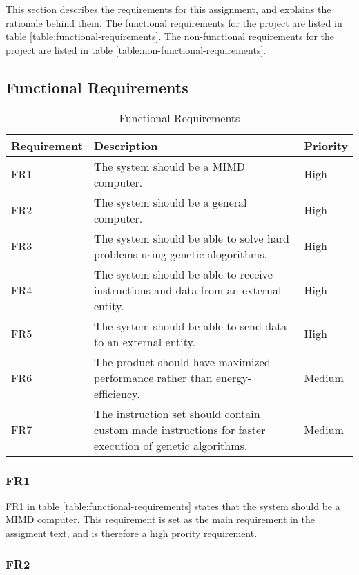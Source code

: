 This section describes the requirements for this assignment, and explains the rationale behind them.
The functional requirements for the project are listed in table \vref{table:functional-requirements}.
The non-functional requirements for the project are listed in table \vref{table:non-functional-requirements}.

 \subsection{Functional Requirements}

 \begin{table}[H]
 \begin{center}
 \begin{tabular}{| l | p{7cm} | l |}
 \hline
 Requirement & Description & Priority\\
 \hline
 FR1 & The system should be a MIMD computer. & High \\
 FR2 & The system should be a general computer. & High \\
 FR3 & The system should be able to solve hard problems using genetic alogorithms. & High \\
 FR4 & The system should be able to receive instructions and data from an external entity. & High \\
 FR5 & The system should be able to send data to an external entity. & High \\
 FR6 & The product should have maximized performance rather than energy-efficiency. & Medium \\
 FR7 & The instruction set should contain custom made instructions for faster execution of genetic algorithms. & Medium \\
 \hline
 \end{tabular}
 \caption{Functional Requirements}
 \label{table:functional-requirements}
 \end{center}
 \end{table}

\subsubsection{FR1}

FR1 in table \vref{table:functional-requirements} states that the system should be a MIMD computer.
This requirement is set as the main requirement in the assigment text, and is therefore a high prority requirement.

\subsubsection{FR2}

